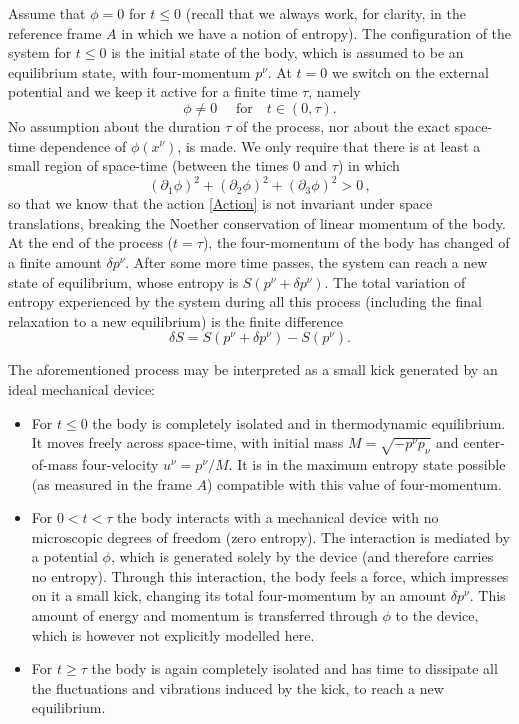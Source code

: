 \documentclass[twocolumn,usenatbib]{mnras2}
\begin{document}
Assume that $\phi=0$ for $t\leq 0$ (recall that we always work, for clarity, in the reference frame $A$ in which we have a notion of entropy). The configuration of the system for $t\leq 0$ is the initial state of the body, which is assumed to be an equilibrium state, with four-momentum $p^\nu$. At $t= 0$ we switch on the external potential and we keep it active for a finite time $\tau$, namely
\begin{equation}
\phi \neq 0  \quad \text{ for} \quad  t \in (0,\tau).
\end{equation} 
No assumption about the duration $\tau$ of the process, nor about the exact space-time dependence of $\phi(x^\nu)$, is made. We only require that there is at least a small region of space-time (between the times $0$ and $\tau$) in which 
\begin{equation}
(\partial_1 \phi)^2 + (\partial_2 \phi)^2 + (\partial_3 \phi)^2 >0 \, ,
\end{equation}
so that we know that the action \eqref{Action} is not invariant under space translations, breaking the Noether conservation of linear momentum of the body. At the end of the process ($t=\tau$), the four-momentum of the body has changed of a finite amount $\delta p^\nu$. After some more time passes, the system can reach a new state of equilibrium, whose entropy is $S(p^\nu+ \delta p^\nu)$. The total variation of entropy experienced by the system during all this process (including the final relaxation to a new equilibrium) is the finite difference
\begin{equation}
\delta S = S(p^\nu +\delta p^\nu) - S(p^\nu).
\end{equation}

The aforementioned process may be interpreted as a small kick generated by an ideal mechanical device:
\begin{itemize}
\item For $t\leq 0$ the body is completely isolated and in thermodynamic equilibrium. It moves freely across space-time, with initial mass $M=\sqrt{-p^\nu p_\nu}$ and center-of-mass four-velocity $u^\nu=p^\nu/M$. It is in the maximum entropy state possible (as measured in the frame $A$) compatible with this value of four-momentum.
\item For $0< t < \tau$ the body interacts with a mechanical device with no microscopic degrees of freedom (zero entropy). The interaction is mediated by a potential $\phi$, which is generated solely by the device (and therefore carries no entropy). Through this interaction, the body feels a force, which impresses on it a small kick, changing its total four-momentum by an amount $\delta p^\nu$. This amount of energy and momentum is transferred through $\phi$ to the device, which is however not explicitly modelled here. 
\item For $t \geq \tau$ the body is again completely isolated and has time to dissipate all the fluctuations and vibrations induced by the kick, to reach a new equilibrium.
\end{itemize}
\end{document}

